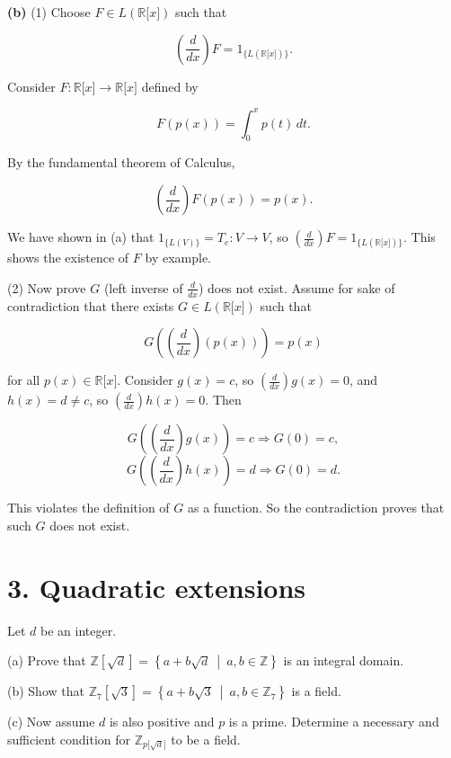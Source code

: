 \textbf{(b)} (1) Choose \(F \in L\left( {\mathbb{R}\lbrack x\rbrack} \right)\) such that

\[\left( \frac{d}{dx} \right)F = 1_{\{{L{({\mathbb{R}{\lbrack x\rbrack}})}}\}}.\]

Consider \(F:\mathbb{R}\lbrack x\rbrack\rightarrow\mathbb{R}\lbrack x\rbrack\) defined by

\[F\left( {p(x)} \right) = \int_{0}^{x}p(t)\, dt.\]

By the fundamental theorem of Calculus,

\[\left( \frac{d}{dx} \right)F\left( {p(x)} \right) = p(x).\]

We have shown in (a) that \(1_{\{{L{(V)}}\}} = T_{e}:V\rightarrow V\), so \(\left( \frac{d}{dx} \right)F = 1_{\{{L{({\mathbb{R}{\lbrack x\rbrack}})}}\}}\). This shows the existence of \(F\) by example.

(2) Now prove \(G\) (left inverse of \(\frac{d}{dx}\)) does not exist. Assume for sake of contradiction that there exists \(G \in L\left( {\mathbb{R}\lbrack x\rbrack} \right)\) such that

\[G\left( {\left( \frac{d}{dx} \right)\left( {p(x)} \right)} \right) = p(x)\]

for all \(p(x) \in \mathbb{R}\lbrack x\rbrack\). Consider \(g(x) = c\), so \(\left( \frac{d}{dx} \right)g(x) = 0\), and \(h(x) = d \neq c\), so \(\left( \frac{d}{dx} \right)h(x) = 0\). Then

\[G\left( {\left( \frac{d}{dx} \right)g(x)} \right) = c\Rightarrow G(0) = c,\]\[G\left( {\left( \frac{d}{dx} \right)h(x)} \right) = d\Rightarrow G(0) = d.\]

This violates the definition of \(G\) as a function. So the contradiction proves that such \(G\) does not exist.

\section{3. Quadratic extensions}

Let \(d\) be an integer.

(a) Prove that \(\mathbb{Z}\left\lbrack \sqrt{d} \right\rbrack = \left\{ a + b\sqrt{d}\  \middle| \ a,b \in \mathbb{Z} \right\}\) is an integral domain.

(b) Show that \(\mathbb{Z}_{7}\left\lbrack \sqrt{3} \right\rbrack = \left\{ a + b\sqrt{3}\  \middle| \ a,b \in \mathbb{Z}_{7} \right\}\) is a field.

(c) Now assume \(d\) is also positive and \(p\) is a prime. Determine a necessary and sufficient condition for \(\mathbb{Z}_{p{\lbrack\sqrt{d}\rbrack}}\) to be a field.

